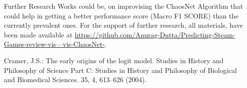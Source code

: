 \documentclass[runningheads]{llncs}
\begin{document}
Further Research Works could be, on improvising the ChaosNet Algorithm that could help in getting a better performance score (Macro F1 SCORE) than the currently prevalent ones. For the support of further research, all materials, have been made available at \href{https://github.com/Anurag-Dutta/Predicting-Steam-Games-review-vis---vis-ChaosNet-}{https://github.com/Anurag-Dutta/Predicting-Steam-Games-review-vis---vis-ChaosNet-}. 
\begin{thebibliography}{8}
Cramer, J.S.: The early origins of the logit model. Studies in History and Philosophy of Science Part C: Studies in History and Philosophy of Biological and Biomedical Sciences. 35, 4, 613–626 (2004). 
\end{thebibliography}
\end{document}

